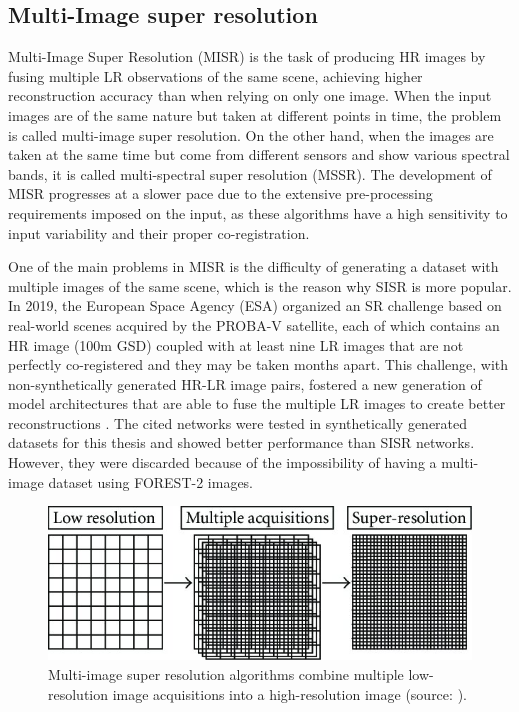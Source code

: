     \subsection{Multi-Image super resolution}

        Multi-Image Super Resolution (MISR) is the task of producing HR images by fusing multiple LR observations of the same scene, achieving higher reconstruction accuracy than when relying on only one image. When the input images are of the same nature but taken at different points in time, the problem is called multi-image super resolution. On the other hand, when the images are taken at the same time but come from different sensors and show various spectral bands, it is called multi-spectral super resolution (MSSR).
        The development of MISR progresses at a slower pace due to the extensive pre-processing requirements imposed on the input, as these algorithms have a high sensitivity to input variability and their proper co-registration.  

        One of the main problems in MISR is the difficulty of generating a dataset with multiple images of the same scene, which is the reason why SISR is more popular.
        In 2019, the European Space Agency (ESA) organized an SR challenge  \cite{martens2019superresolution} based on real-world scenes acquired by the PROBA-V satellite, each of which contains an HR image (100m GSD) coupled with at least nine LR images that are not perfectly co-registered and they may be taken months apart. 
        This challenge, with non-synthetically generated HR-LR image pairs, fostered a new generation of model architectures that are able to fuse the multiple LR images to create better reconstructions \cite{Salvetti_2020,Bordone_Molini_2020}.
         The cited networks were tested in synthetically generated datasets for this thesis and showed better performance than SISR networks. However, they were discarded because of the impossibility of having a multi-image dataset using FOREST-2 images.

        \begin{figure}[H]
            \centering
            \includegraphics[width=\textwidth]{Includes/2-MISR.jpeg}
            \caption{Multi-image super resolution algorithms combine multiple low-resolution image acquisitions into a high-resolution image (source: \cite{MISR2007}).}
            \label{fig:2-MISR}
        \end{figure}
        
